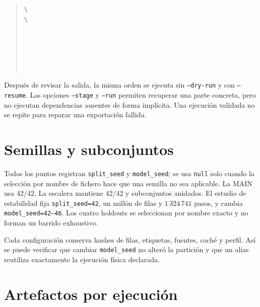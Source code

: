 \begin{quote}\small
{} \texttt{\textbackslash}\\
\hspace*{1em} \texttt{\textbackslash}\\
\hspace*{1em}\\
\hspace*{1em}\\
\hspace*{1em}\\
\hspace*{1em}\\
\hspace*{1em}\\
\hspace*{1em}
\end{quote}

Después de revisar la salida, la misma orden se ejecuta sin \texttt{--dry-run} y con \texttt{--resume}. Las opciones \texttt{--stage} y \texttt{--run} permiten recuperar una parte concreta, pero no ejecutan dependencias ausentes de forma implícita. Una ejecución validada no se repite para reparar una exportación fallida.

\section{Semillas y subconjuntos}

Todos los puntos registran \texttt{split\_seed} y \texttt{model\_seed}; se usa \texttt{null} solo cuando la selección por nombre de fichero hace que una semilla no sea aplicable. La MAIN usa 42/42. La escalera mantiene 42/42 y subconjuntos anidados. El estudio de estabilidad fija \texttt{split\_seed=42}, un millón de filas y $1\,324\,741$ pasos, y cambia \texttt{model\_seed=42--46}. Los cuatro holdouts se seleccionan por nombre exacto y no forman un barrido exhaustivo.

Cada configuración conserva hashes de filas, etiquetas, fuentes, caché y perfil. Así se puede verificar que cambiar \texttt{model\_seed} no alteró la partición y que un alias reutiliza exactamente la ejecución física declarada.

\section{Artefactos por ejecución}

